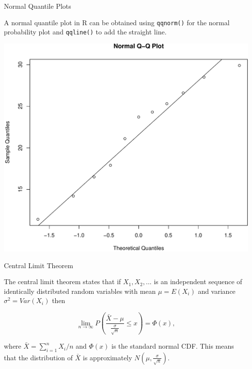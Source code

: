 \documentclass[9pt,ignorenonframetext,]{beamer}
\newenvironment{Shaded}{\begin{snugshade}}{\end{snugshade}}
\newcommand{\KeywordTok}[1]{\textcolor[rgb]{0.13,0.29,0.53}{\textbf{{#1}}}}
\newcommand{\NormalTok}[1]{{#1}}
\begin{document}
\begin{frame}[fragile]{Normal Quantile Plots}

A normal quantile plot in R can be obtained using \texttt{qqnorm()} for
the normal probability plot and \texttt{qqline()} to add the straight
line.

\begin{Shaded}
\end{Shaded}

\includegraphics{class2-jan11_files/figure-beamer/unnamed-chunk-9-1.pdf}

\end{frame}

\begin{frame}{Central Limit Theorem}

The central limit theorem states that if \(X_1, X_2, ...\) is an
independent sequence of identically distributed random variables with
mean \(\mu=E(X_i)\) and variance \(\sigma^2=Var(X_i)\) then

\[ \lim_{n\to\infty} P\left(\frac{\bar X - \mu}{\frac {\sigma}{\sqrt n}} \leq x \right) = \Phi(x),\]

where \({\bar X} = \sum_{i=1}^{n} X_i/n\) and \(\Phi(x)\) is the
standard normal CDF. This means that the distribution of \({\bar X}\) is
approximately \(N\left(\mu,{\frac {\sigma}{\sqrt n}}\right)\).

\end{frame}
\end{document}
